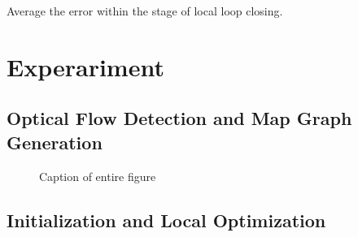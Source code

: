 \documentclass{article}
\begin{document}
Average the error within the stage of local loop closing.

\section{Experariment}

\subsection{Optical Flow Detection and Map Graph Generation}

\begin{figure}
 \hfill
 \hfill

\caption{Caption of entire figure}
\end{figure}

\subsection{Initialization and Local Optimization}






\end{document}
